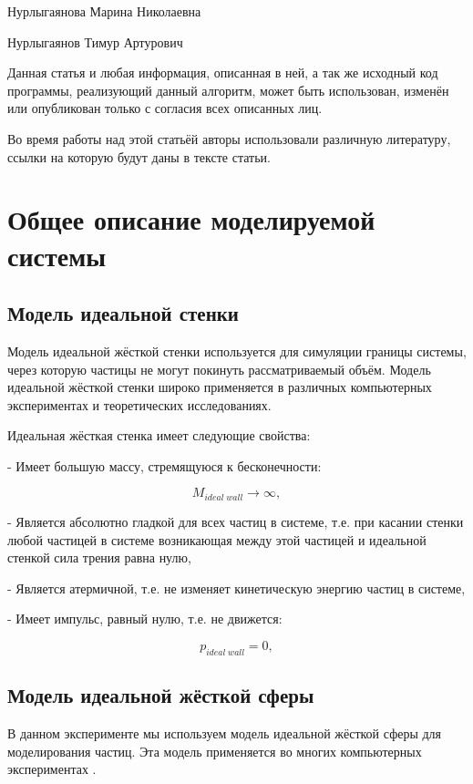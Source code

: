 \documentclass{article}
\begin{document}
Нурлыгаянова Марина Николаевна

Нурлыгаянов Тимур Артурович

Данная статья и любая информация, описанная в ней, а так же исходный код программы, реализующий данный алгоритм, может быть использован, изменён или опубликован только с согласия всех описанных лиц.

Во время работы над этой статьёй авторы использовали различную литературу, ссылки на которую будут даны в тексте статьи.

\newpage
\section{Общее описание моделируемой системы}

\subsection{Модель идеальной стенки}
Модель идеальной жёсткой стенки используется для симуляции границы системы, через которую частицы не могут покинуть рассматриваемый объём. Модель идеальной жёсткой стенки широко применяется в различных компьютерных экспериментах и теоретических исследованиях.

Идеальная жёсткая стенка имеет следующие свойства:

 - Имеет большую массу, стремящуюся к бесконечности:
 
\begin{equation}
        M_{ideal \; wall} \to \infty,
\end{equation}

 - Является абсолютно гладкой для всех частиц в системе, т.е. при касании стенки любой частицей в системе возникающая между этой частицей и идеальной стенкой сила трения равна нулю,
 
 - Является атермичной, т.е. не изменяет кинетическую энергию частиц в системе,
 
 - Имеет импульс, равный нулю, т.е. не движется:
 
\begin{equation}
        p_{ideal \; wall} = 0,
\end{equation}


\subsection{Модель идеальной жёсткой сферы}
В данном эксперименте мы используем модель идеальной жёсткой сферы для моделирования частиц. Эта модель применяется во многих компьютерных экспериментах \cite{Rosenbluth_Chem_Phys_22_881_1954} \cite{Wood_and_Jacobson_1957} \cite{Alder_and_Wainwright_Phase_Transition_for_a_Hard_Sphere_System}.
\end{document}

